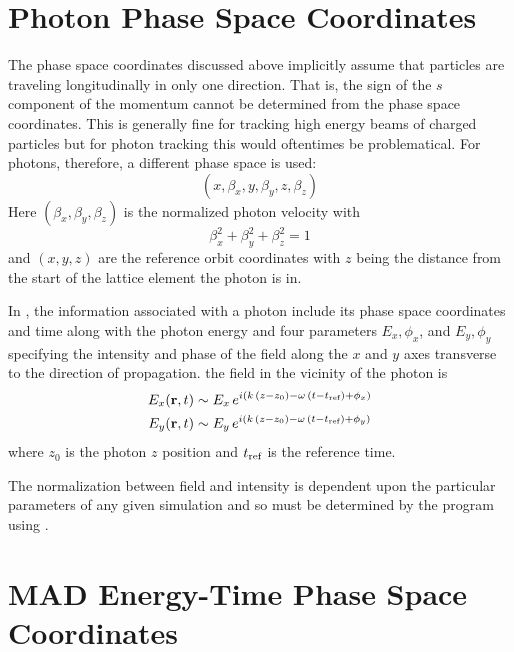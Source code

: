 \section{Photon Phase Space Coordinates}
\label{s:photon.phase.space}

The phase space coordinates discussed above implicitly assume that
particles are traveling longitudinally in only one direction. That is,
the sign of the $s$ component of the momentum cannot be determined
from the phase space coordinates. This is generally fine for tracking
high energy beams of charged particles but for photon tracking this
would oftentimes be problematical. For photons, therefore, a different
phase space is used:
\begin{equation}
  (x, \beta_x, y, \beta_y, z, \beta_z)
  \label{xbybzb}
\end{equation}
Here $(\beta_x, \beta_y, \beta_z)$ is the normalized photon velocity with
\begin{equation}
  \beta_x^2 + \beta_y^2 + \beta_z^2 = 1 
  \label{bbb1}
\end{equation}
and $(x, y, z)$ are the reference orbit coordinates with $z$ being the
distance from the start of the lattice element the photon is in.

In \bmad, the information associated with a photon include its phase
space coordinates and time along with the photon energy and four
parameters $E_x, \phi_x$, and $E_y, \phi_y$ specifying the intensity
and phase of the field along the $x$ and $y$ axes transverse to the
direction of propagation.  the field in the vicinity of the photon is
\begin{align}
  E_x ({\bf r}, t) &\sim E_x \, e^{i (k \, (z - z_0) - \omega \, (t - t_{\text{ref}}) + \phi_x)} \nonumber \\
  E_y ({\bf r}, t) &\sim E_y \, e^{i (k \, (z - z_0) - \omega \, (t - t_{\text{ref}}) + \phi_y)} 
  \label{ertee}
\end{align}
where $z_0$ is the photon $z$ position and $t_{\text{ref}}$ is the reference time.

The normalization between field and intensity is dependent upon the
particular parameters of any given simulation and so must be
determined by the program using \bmad.

\section{MAD Energy-Time Phase Space Coordinates}
\label{energy.phase.space}

